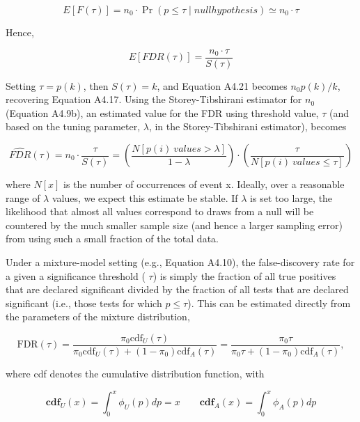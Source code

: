 \documentclass{article}
\begin{document}
\begin{equation}
E[F(\tau)]=n_{0}\cdot\Pr(p\leq\tau\mid null hypothesis)\simeq n_{0}\cdot\tau
\end{equation}

Hence,

\begin{equation}
E[FDR(\tau)]=\frac{n_{0}\cdot\tau}{S(\tau)}
\end{equation}

Setting  $ \tau = p(k) $, then  $ S(\tau) = k $, and Equation A4.21 becomes  $ n_0 p(k)/k $, recovering Equation A4.17. Using the Storey-Tibshirani estimator for  $ n_0 $ (Equation A4.9b), an estimated value for the FDR using threshold value,  $ \tau $ (and based on the tuning parameter,  $ \lambda $, in the Storey-Tibshirani estimator), becomes

\begin{equation}
\widehat{F D R}(\tau)=n_{0}\cdot\frac{\tau}{S(\tau)}=\left(\frac{N[p(i)\ values>\lambda]}{1-\lambda}\right)\cdot\left(\frac{\tau}{N[p(i)\ values\leq\tau]}\right)
\end{equation}

where  $ N[x] $ is the number of occurrences of event x. Ideally, over a reasonable range of  $ \lambda $ values, we expect this estimate be stable. If  $ \lambda $ is set too large, the likelihood that almost all values correspond to draws from a null will be countered by the much smaller sample size (and hence a larger sampling error) from using such a small fraction of the total data.

Under a mixture-model setting (e.g., Equation A4.10), the false-discovery rate for a given a significance threshold ( $ \tau $) is simply the fraction of all true positives that are declared significant divided by the fraction of all tests that are declared significant (i.e., those tests for which  $ p \leq \tau $). This can be estimated directly from the parameters of the mixture distribution,

\begin{equation}
\mathrm{F D R}(\tau)=\frac{\pi_{0}\mathrm{c d f}_{U}(\tau)}{\pi_{0}\mathrm{c d f}_{U}(\tau)+\left(1-\pi_{0}\right)\mathrm{c d f}_{A}(\tau)}=\frac{\pi_{0}\tau}{\pi_{0}\tau+\left(1-\pi_{0}\right)\mathrm{c d f}_{A}(\tau)},
\end{equation}

where cdf denotes the cumulative distribution function, with

\begin{equation}
\mathbf{c}\mathbf{d}\mathbf{f}_{U}(x)=\int_{0}^{x}\phi_{U}(p)d p=x\qquad\mathbf{c}\mathbf{d}\mathbf{f}_{A}(x)=\int_{0}^{x}\phi_{A}(p)d p
\end{equation}
\end{document}
